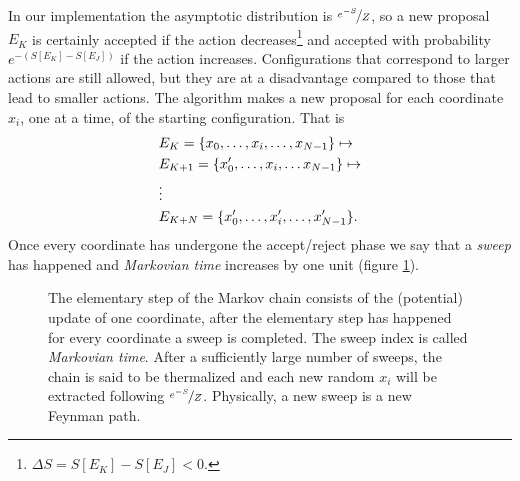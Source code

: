 In our implementation the asymptotic distribution is $\nicefrac{e ^{-S}}{Z}$, so a new proposal $E_{K}$ is certainly accepted if the action decreases\footnote{$\Delta S = S[E_{K}]-S[E_{J}] < 0$.}
and accepted with probability $e ^{-\left(S[E_{K}]-S[E_{J}]\right)}$ if the action increases.
Configurations that correspond to larger actions are still allowed, but they are at a disadvantage compared to those that lead to smaller actions.
The algorithm makes a new proposal for each coordinate $x_i$, one at a time, of the starting configuration. That is
\begin{align}
  &E_{K} = \{x_{0}, \dots, x_{i}, \dots, x_{N-1}\} \mapsto \notag \\
  &E_{K+1}=\{x_{0}',\dots,x_{i},\dots x_{N-1}\} \mapsto \notag \\
  &\vdots \notag \\
  &E_{K+N}=\{x_{0}', \dots,x_{i}', \dots, x_{N-1}'\}.
\end{align}
Once every coordinate has undergone the accept/reject phase we
say that a \textit{sweep} has happened and \textit{Markovian time} increases by one unit (figure \ref{fig:sweep}).
\begin{figure}[ht]
  \centering
  \caption{\label{fig:sweep}The elementary step of the Markov chain consists of the (potential) update of one coordinate, after the elementary step has happened for every coordinate a sweep is completed. The sweep index
    is called \textit{Markovian time}. After a sufficiently large number of sweeps, the chain
    is said to be thermalized and each new random $x_{i}$ will be extracted following $\nicefrac{e ^{-S}}{Z}$. Physically, a new sweep is a new Feynman path.}
\end{figure}


